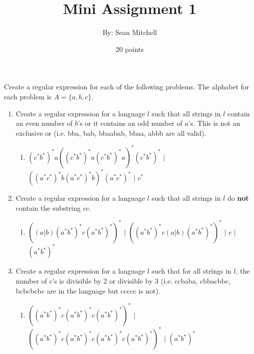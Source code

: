 \documentclass[12pt]{article}
\begin{document}
 
\title{Mini Assignment 1}
\author{By: Sean Mitchell}
\date{20 points}
\maketitle

Create a regular expression for each of the following problems. The alphabet for each problem is $A = \{a, b, c\}$.

\begin{enumerate}
	\item Create a regular expression for a language $l$ such that all strings in $l$ contain an even number of $b$'s or it 		contains an odd number of $a$'s. This is not an exclusive or (i.e. bba, bab, bbaabab, bbaa, abbb are all valid).
    
    \begin{enumerate}
        \item $\left(c^{*}b^{*}\right)^{*}a\left(\left(c^{*}b^{*}\right)^{*}a\left(c^{*}b^{*}\right)^{*}a\right)^{*}\left(c^{*}b^{*}\right)^{*}$
        $\vert$
        $\left(\left(a^{*}c^{*}\right)^{*}b\left(a^{*}c^{*}\right)^{*}b\right)^{*}\left(a^{*}c^{*}\right)^{*}$
        $\vert$
        $c^{*}$
    \end{enumerate}
    
    \item Create a regular expression for a language $l$ such that all strings in $l$ do \textbf{not} contain the substring $cc$.
    \begin{enumerate}
        \item $\left(\left(a \vert b\right)\left(a^{*}b^{*}\right)^{*}c\left(a^{*}b^{*}\right)^{*}\right)^{*}$
        $\vert$
        $\left(\left(a^{*}b^{*}\right)^{*}c\left(a \vert b\right)\left(a^{*}b^{*}\right)^{*}\right)^{*}$
        $\vert$
        $c$
        $\vert$
        $\left(a^{*}b^{*}\right)^{*}$
    \end{enumerate}
    \item Create a regular expression for a language $l$ such that for all strings in $l$, the number of $c$'s is divisible by 2 or divisible by 3 (i.e. ccbaba, cbbacbbc, bcbcbcbc are in the language but ccccc is not).
    \begin{enumerate}
        \item $\left(\left(a^{*}b^{*}\right)^{*}c\left(a^{*}b^{*}\right)^{*}c\left(a^{*}b^{*}\right)^{*}\right)^{*}$
        $\vert$
        $\left(\left(a^{*}b^{*}\right)^{*}c\left(a^{*}b^{*}\right)^{*}c\left(a^{*}b^{*}\right)^{*}c\left(a^{*}b^{*}\right)^{*}\right)^{*}$
        $\vert$
        $\left(a^{*}b^{*}\right)^{*}$
    \end{enumerate}
\end{enumerate}
\end{document}
